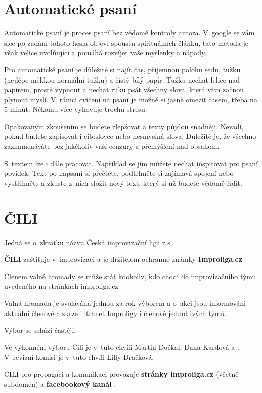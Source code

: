\needspace{5cm} \section{Automatické psaní} \label{automatické psaní} Automatické psaní je proces psaní bez vědomé kontroly autora. V~google se vám sice po zadání tohoto hesla objeví spoustu spirituálních článku, tato metoda je však velice uvolňující a pomáhá rozvíjet vaše myšlenky a nápady. 
 
Pro automatické psaní je důležité si najít čas, příjemnou polohu sedu, tužku (nejlépe měkkou normální tužku) a čistý bílý papír.  
Tužku nechat lehce nad papírem, prostě vypnout a nechat ruku psát všechny slova, která vám začnou plynout myslí. 
V~rámci cvičení na psaní je možné si jasně omezit časem, třeba na 5 minut. Někomu více vyhovuje trochu stresu. 
 
Opakovaným zkoušením se budete zlepšovat a texty půjdou snadněji. 
Nevadí, pokud budete zapisovat i citoslovce nebo nesmyslná slova. Důležité je, že všechno zaznamenáváte bez jakékoliv vaší cenzury a přemýšlení nad obsahem. 
 
S~textem lze i dále pracovat. Například se jím můžete nechat inspirovat pro psaní povídek. 
Text po napsaní si přečtěte, podtrhněte si zajímavá spojení nebo vystřihněte a zkuste z~nich složit nový text, který si už budete vědomě řídit. 
\needspace{5cm} \section{ČILI} \label{čili} Jedná se o~zkratku názvu Česká improvizační liga z.s..   
 
\textbf{ČILI} zaštiťuje  v~improvizaci a je držitelem ochranné známky  \textbf{Improliga.cz} 
 
Členem valné hromady se může stát kdokoliv, kdo chodí do improvizačního týmu uvedeného na stránkách improliga.cz 
 
Valná hromada je svolávána jednou za rok výborem a o~akci jsou informováni aktuální členové a skrze intranet Improligy i členové jednotlivých týmů. 
 
Výbor se schází častěji. 
 
Ve výkonném výboru  Čili je v~tuto chvíli Martin Dočkal, Dana Kardová a . 
V~revizní komisi je v~tuto chvíli Lilly Dračková. 
 
ČILI pro propagaci a komunikaci provozuje \textbf{stránky improliga.cz} (včetně subdomén) a \textbf{facebookový kanál} . 
 
